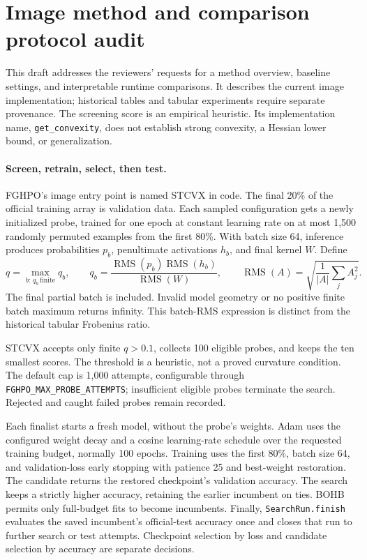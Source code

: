 \section{Image method and comparison protocol audit}%
\label{sec:operational-protocol-audit-draft}

This draft addresses the reviewers' requests for a method overview, baseline settings, and interpretable runtime comparisons. It describes the current image implementation; historical tables and tabular experiments require separate provenance. The screening score is an empirical heuristic. Its implementation name, \texttt{get\_convexity}, does not establish strong convexity, a Hessian lower bound, or generalization.

\paragraph{Screen, retrain, select, then test.}
FGHPO's image entry point is named STCVX in code. The final 20\% of the official training array is validation data. Each sampled configuration gets a newly initialized probe, trained for one epoch at constant learning rate on at most 1,500 randomly permuted examples from the first 80\%. With batch size 64, inference produces probabilities $p_b$, penultimate activations $h_b$, and final kernel $W$. Define
\begin{equation}
    q=\max_{b:\,q_b\ \mathrm{finite}}q_b,\qquad
    q_b=\frac{\operatorname{RMS}(p_b)\operatorname{RMS}(h_b)}{\operatorname{RMS}(W)},
    \qquad \operatorname{RMS}(A)=\sqrt{\frac{1}{|A|}\sum_j A_j^2}.
\end{equation}
The final partial batch is included. Invalid model geometry or no positive finite batch maximum returns infinity. This batch-RMS expression is distinct from the historical tabular Frobenius ratio.

STCVX accepts only finite $q>0.1$, collects 100 eligible probes, and keeps the ten smallest scores. The threshold is a heuristic, not a proved curvature condition. The default cap is 1,000 attempts, configurable through \texttt{FGHPO\_MAX\_PROBE\_ATTEMPTS}; insufficient eligible probes terminate the search. Rejected and caught failed probes remain recorded.

Each finalist starts a fresh model, without the probe's weights. Adam uses the configured weight decay and a cosine learning-rate schedule over the requested training budget, normally 100 epochs. Training uses the first 80\%, batch size 64, and validation-loss early stopping with patience 25 and best-weight restoration. The candidate returns the restored checkpoint's validation accuracy. The search keeps a strictly higher accuracy, retaining the earlier incumbent on ties. BOHB permits only full-budget fits to become incumbents. Finally, \texttt{SearchRun.finish} evaluates the saved incumbent's official-test accuracy once and closes that run to further search or test attempts. Checkpoint selection by loss and candidate selection by accuracy are separate decisions.

